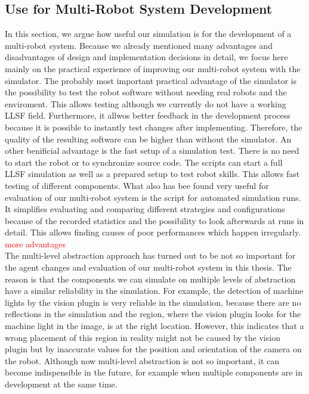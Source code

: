 \subsection{Use for Multi-Robot System Development}
In this section, we argue how useful our simulation is for the development of a multi-robot system. Because we already mentioned many advantages and disadvantages of design and implementation decisions in detail, we focus here mainly on the practical experience of improving our multi-robot system with the simulator. 
The probably most important practical advantage of the simulator is the possibility to test the robot software without needing real robots and the enviroment. This allows testing although we currently do not have a working LLSF field. Furthermore, it allwos better feedback in the development process because it is possible to instantly test changes after implementing. Therefore, the quality of the resulting software can be higher than without the simulator. An other benificial advantage is the fast setup of a simulation test. There is no need to start the robot or to synchronize source code. The scripts can start a full LLSF simulation as well as a prepared setup to test robot skills. This allows fast testing of different components.
What also has bee found very useful for evaluation of our multi-robot system is the script for automated simulation runs. It simplifies evaluating and comparing different strategies and configurations because of the recorded statistics and the possibility to look afterwards at runs in detail. This allows finding causes of poor performances which happen irregularly.
\textcolor{red}{more advantages}\\
The multi-level abstraction approach has turned out to be not so important for the agent changes and evaluation of our multi-robot system in this thesis. The reason is that the components we can simulate on multiple levels of abstraction have a similar reliability in the simulation. For example, the detection of machine lights by the vision plugin is very reliable in the simulation, because there are no reflections in the simulation and the region, where the vision plugin looks for the machine light in the image, is at the right location. However, this indicates that a wrong placement of this region in reality might not be caused by the vision plugin but by inaccurate values for the position and orientation of the camera on the robot. Although now multi-level abstraction is not so important, it can become indispensible in the future, for example when multiple components are in development at the same time.\\
